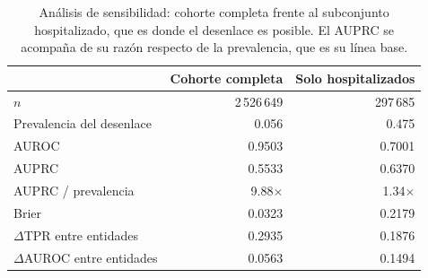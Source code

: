 
\begin{table}[htbp]
\centering
\small
\caption{Análisis de sensibilidad: cohorte completa frente al subconjunto
hospitalizado, que es donde el desenlace es posible. El AUPRC se acompaña de su
razón respecto de la prevalencia, que es su línea base.}
\label{tab:sensibilidad}
\begin{tabular}{l r r}
\toprule
& Cohorte completa & Solo hospitalizados \\
\midrule
$n$ & 2\,526\,649 & 297\,685 \\
Prevalencia del desenlace & 0.056 & 0.475 \\
\midrule
AUROC & 0.9503 & 0.7001 \\
AUPRC & 0.5533 & 0.6370 \\
AUPRC / prevalencia & 9.88$\times$ & 1.34$\times$ \\
Brier & 0.0323 & 0.2179 \\
\midrule
$\Delta$TPR entre entidades & 0.2935 & 0.1876 \\
$\Delta$AUROC entre entidades & 0.0563 & 0.1494 \\
\bottomrule
\end{tabular}
\end{table}
